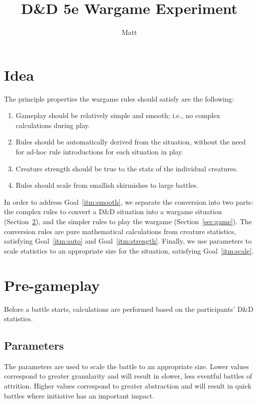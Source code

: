 \documentclass{article}
\begin{document}
\title{D\&D 5e Wargame Experiment}
\author{Matt}
\maketitle

\section{Idea}

The principle properties the wargame rules should satisfy are the following:
\begin{enumerate}
    \item \label{itm:smooth} Gameplay should be relatively simple and smooth;
        i.e., no complex calculations during play.
    \item \label{itm:auto} Rules should be automatically derived from the situation,
        without the need for ad-hoc rule introductions for each situation in play.
    \item \label{itm:strength} Creature strength should be true to the stats of the individual creatures.
    \item \label{itm:scale} Rules should scale from smallish skirmishes to large battles.
\end{enumerate}

In order to address Goal~\ref{itm:smooth}, we separate the conversion into two parts:
the complex rules to convert a D\&D situation into a wargame situation (Section~\ref{sec:pregame}),
and the simpler rules to play the wargame (Section~\ref{sec:game}).
The conversion rules are pure mathematical calculations from creature statistics,
satisfying Goal~\ref{itm:auto} and Goal~\ref{itm:strength}.
Finally, we use parameters to scale statistics to an appropriate size for the situation,
satisfying Goal~\ref{itm:scale}.

\section{Pre-gameplay}\label{sec:pregame}

Before a battle starts,
calculations are performed based on the participants' D\&D statistics.

\subsection{Parameters}

The parameters are used to scale the battle to an appropriate size.
Lower values correspond to greater granularity
and will result in slower, less eventful battles of attrition.
Higher values correspond to greater abstraction
and will result in quick battles where initiative has an important impact.
\end{document}
